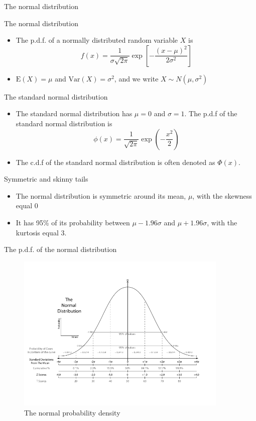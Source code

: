 \documentclass[presentation]{beamer}
\begin{document}
\begin{frame}[label={sec:org60b85b2}]{The normal distribution}
\begin{block}{The normal distribution}
\begin{itemize}
\item The p.d.f. of a normally distributed random variable \(X\) is
\[ f(x) =
  \frac{1}{\sigma\sqrt{2\pi}}\exp\left[-\frac{(x-\mu)^{2}}{2\sigma^{2}}\right]
  \]
\item \(\mathrm{E}(X) = \mu\) and \(\mathrm{Var}(X) = \sigma^{2}\), and we write \(X \sim N(\mu, \sigma^{2})\)
\end{itemize}
\end{block}

\begin{block}{The standard normal distribution}
\begin{itemize}
\item The standard normal distribution has \(\mu = 0\) and \(\sigma = 1\). The p.d.f of the
standard normal distribution is
\[
  \phi(x) = \frac{1}{\sqrt{2\pi}}\exp\left(-\frac{x^2}{2}\right)
  \]
\item The c.d.f of the standard normal distribution is often denoted as
\(\Phi(x)\).
\end{itemize}
\end{block}
\end{frame}

\begin{frame}[label={sec:orge7bb7ff}]{Symmetric and skinny tails}
\begin{itemize}
\item The normal distribution is symmetric around its mean, \(\mu\), with the
skewness equal 0
\item It has 95\% of its probability between
\(\mu-1.96\sigma\) and \(\mu+1.96\sigma\), with the kurtosis
equal 3.
\end{itemize}
\end{frame}

\begin{frame}[label={sec:orgf581cbc}]{The p.d.f. of the normal distribution}
\begin{figure}[htbp]
\centering
\includegraphics[width=0.9\textwidth]{figure/Normal-distribution-curve.png}
\caption{\label{fig:org0b40732}
The normal probability density}
\end{figure}
\end{frame}
\end{document}
